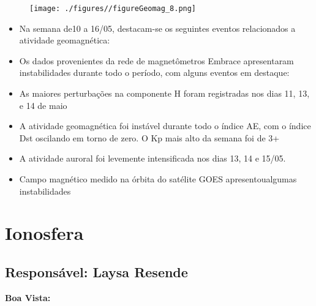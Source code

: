 \documentclass[a4paper, 10pt]{article}
\begin{document}
                     \begin{figure}[H]
    
                        \centering
   
                             \texttt{[image: ./figures//figureGeomag\_8.png]}

                        \end{figure}

                     \begin{itemize} 
\item Na semana de10 a 16/05, destacam-se os seguintes eventos relacionados a atividade geomagnética:
\item Os dados provenientes da rede de magnetômetros Embrace apresentaram instabilidades durante todo o período, com alguns eventos em destaque:
\item As maiores perturbações na componente H foram registradas nos dias 11, 13, e 14 de maio
\item A atividade geomagnética foi instável durante todo o índice AE, com o índice Dst oscilando em torno de zero. O Kp mais alto da semana foi de 3+
\item  A atividade auroral foi levemente intensificada nos dias 13, 14 e 15/05.
\item Campo magnético medido na órbita do satélite GOES apresentoualgumas instabilidades
\end{itemize} 
\section{Ionosfera} 
 \subsection{Responsável: Laysa Resende} 
 
\textbf{Boa Vista: }
\end{document}
